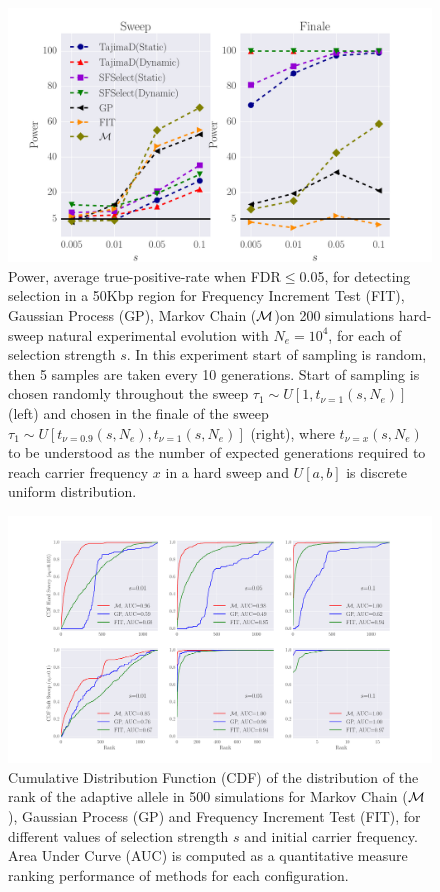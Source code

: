 \documentclass[11pt]{article}
\begin{document}
\begin{figure}[H]
	\centering
	\includegraphics[trim=.4in 0 .8in 0.6in , clip,width=\textwidth]{figures/naturalee.pdf}
	\caption{Power, average true-positive-rate when FDR$\le$0.05, for detecting selection in a 50Kbp region for Frequency Increment Test (FIT), Gaussian Process (GP), Markov Chain (${\cal M}$)on 200 
		simulations hard-sweep natural experimental evolution with $N_e=10^4$, for each of selection strength $s$. In this experiment start of sampling is random, then 5 samples are taken every 10 generations. Start of sampling is chosen randomly throughout the sweep $\tau_1 \sim U\left[1,t_{\nu=1}(s,N_e)\right]$ (left) and chosen in the finale of the sweep $\tau_1 \sim U\left[t_{\nu=0.9}(s,N_e),t_{\nu=1}(s,N_e)\right]$ (right), where $t_{\nu=x}(s,N_e)$ to be understood as the number of expected generations required to reach carrier frequency $x$ in a hard sweep and $U[a,b]$ is discrete uniform distribution.} \label{fig:powerSFS}
\end{figure}

\newpage
\begin{figure}[H]
	\centering
	\includegraphics[trim=.2in 0 .2in 0, 
	clip,width=\textwidth]{figures/rank.pdf}
	\caption{Cumulative Distribution  Function (CDF) of the distribution of the rank of the adaptive allele in 500 simulations for Markov Chain (${\cal M}$), Gaussian Process (GP) and Frequency Increment Test (FIT), for different values of selection strength $s$ and initial carrier frequency. Area Under Curve (AUC) is computed as a quantitative measure ranking performance of methods for each configuration.}
	\label{fig:rank}
\end{figure}
\end{document}
